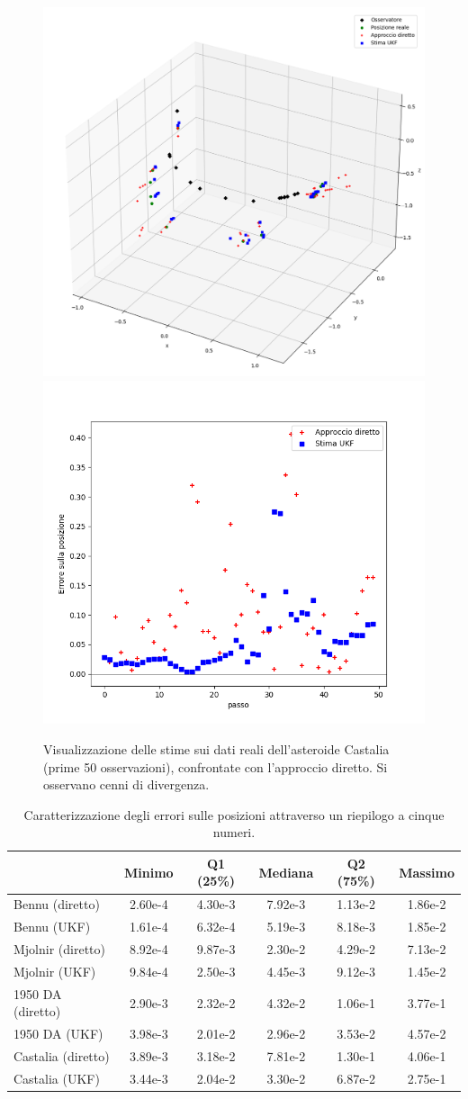 \documentclass[12pt,a4paper,openright,twoside]{book}
\begin{document}
\begin{figure}
	\includegraphics[width=0.55\linewidth]{figures/Castalia_50_3d.png}
    \includegraphics[width=0.45\linewidth]{figures/Castalia_50_error.png}
    \caption{Visualizzazione delle stime sui dati reali dell'asteroide Castalia (prime 50 osservazioni), confrontate con l'approccio diretto. Si osservano cenni di divergenza.}
    \label{fig:Castalia50}
\end{figure}

\begin{table}
\begin{tabular*}{\textwidth}{@{\extracolsep{\fill}}lccccc@{}}
                   & Minimo  & Q1 (25\%) & Mediana & Q2 (75\%) & Massimo \\\toprule
Bennu (diretto)    & 2.60e-4 & 4.30e-3 & 7.92e-3 & 1.13e-2 & 1.86e-2 \\
Bennu (UKF)        & 1.61e-4 & 6.32e-4 & 5.19e-3 & 8.18e-3 & 1.85e-2 \\\midrule
Mjolnir (diretto)  & 8.92e-4 & 9.87e-3 & 2.30e-2 & 4.29e-2 & 7.13e-2 \\
Mjolnir (UKF)      & 9.84e-4 & 2.50e-3 & 4.45e-3 & 9.12e-3 & 1.45e-2 \\\midrule
1950 DA (diretto)  & 2.90e-3 & 2.32e-2 & 4.32e-2 & 1.06e-1 & 3.77e-1 \\
1950 DA (UKF)      & 3.98e-3 & 2.01e-2 & 2.96e-2 & 3.53e-2 & 4.57e-2 \\\midrule
Castalia (diretto) & 3.89e-3 & 3.18e-2 & 7.81e-2 & 1.30e-1 & 4.06e-1 \\
Castalia (UKF)     & 3.44e-3 & 2.04e-2 & 3.30e-2 & 6.87e-2 & 2.75e-1 \\\midrule
\end{tabular*}
\caption{Caratterizzazione degli errori sulle posizioni attraverso un riepilogo a cinque numeri.}
\end{table}
\end{document}
